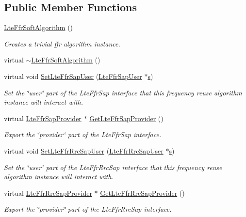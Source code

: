 \subsection*{Public Member Functions}
\begin{DoxyCompactItemize}
\item 
\hyperlink{classns3_1_1LteFfrSoftAlgorithm_a0a5a0ec557890339cae51572157ad6f8}{Lte\+Ffr\+Soft\+Algorithm} ()
\begin{DoxyCompactList}\small\item\em Creates a trivial ffr algorithm instance. \end{DoxyCompactList}\item 
virtual \hyperlink{classns3_1_1LteFfrSoftAlgorithm_a6213a2d7faa45965cbe7002dd43a16a7}{$\sim$\+Lte\+Ffr\+Soft\+Algorithm} ()
\item 
virtual void \hyperlink{classns3_1_1LteFfrSoftAlgorithm_a9fd7087c854f180f8bfaabd036d68dc0}{Set\+Lte\+Ffr\+Sap\+User} (\hyperlink{classns3_1_1LteFfrSapUser}{Lte\+Ffr\+Sap\+User} $\ast$\hyperlink{generate__test__data__lte__sinr_8m_ad83eeb3a142285d1243a08c6b7026df8}{s})
\begin{DoxyCompactList}\small\item\em Set the \char`\"{}user\char`\"{} part of the Lte\+Ffr\+Sap interface that this frequency reuse algorithm instance will interact with. \end{DoxyCompactList}\item 
virtual \hyperlink{classns3_1_1LteFfrSapProvider}{Lte\+Ffr\+Sap\+Provider} $\ast$ \hyperlink{classns3_1_1LteFfrSoftAlgorithm_affe8e880bce232310090ff8350bed95c}{Get\+Lte\+Ffr\+Sap\+Provider} ()
\begin{DoxyCompactList}\small\item\em Export the \char`\"{}provider\char`\"{} part of the Lte\+Ffr\+Sap interface. \end{DoxyCompactList}\item 
virtual void \hyperlink{classns3_1_1LteFfrSoftAlgorithm_a713409cab2450366e3b02e6194e198c1}{Set\+Lte\+Ffr\+Rrc\+Sap\+User} (\hyperlink{classns3_1_1LteFfrRrcSapUser}{Lte\+Ffr\+Rrc\+Sap\+User} $\ast$\hyperlink{generate__test__data__lte__sinr_8m_ad83eeb3a142285d1243a08c6b7026df8}{s})
\begin{DoxyCompactList}\small\item\em Set the \char`\"{}user\char`\"{} part of the Lte\+Ffr\+Rrc\+Sap interface that this frequency reuse algorithm instance will interact with. \end{DoxyCompactList}\item 
virtual \hyperlink{classns3_1_1LteFfrRrcSapProvider}{Lte\+Ffr\+Rrc\+Sap\+Provider} $\ast$ \hyperlink{classns3_1_1LteFfrSoftAlgorithm_a542254e325d32087ee37f956fe626d90}{Get\+Lte\+Ffr\+Rrc\+Sap\+Provider} ()
\begin{DoxyCompactList}\small\item\em Export the \char`\"{}provider\char`\"{} part of the Lte\+Ffr\+Rrc\+Sap interface. \end{DoxyCompactList}\end{DoxyCompactItemize}
